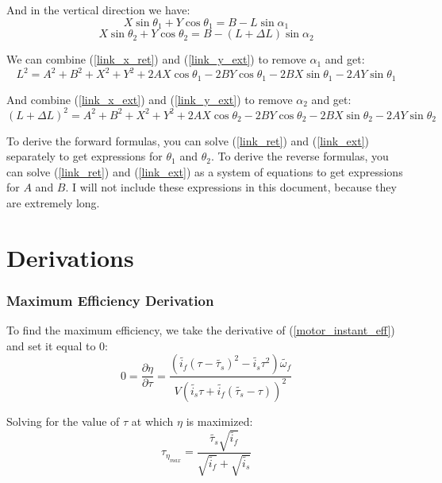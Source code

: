 \documentclass[11pt,a4paper,titlepage]{article}
\begin{document}
	And in the vertical direction we have:
	\begin{equation} \label{link_y_ret}
		X \sin \theta_1 + Y \cos \theta_1 = B - L \sin \alpha_1
	\end{equation}
	\begin{equation} \label{link_y_ext}
		X \sin \theta_2 + Y \cos \theta_2 = B - (L + \Delta L) \sin \alpha_2
	\end{equation}
	
	We can combine (\ref{link_x_ret}) and (\ref{link_y_ext}) to remove $\alpha_1$ and get:
	\begin{equation} \label{link_ret}
		L^2 = A^2 + B^2 + X^2 + Y^2 + 2AX \cos \theta_1 - 2BY \cos \theta_1 - 2BX \sin \theta_1 - 2AY \sin \theta_1
	\end{equation}
	
	And combine (\ref{link_x_ext}) and (\ref{link_y_ext}) to remove $\alpha_2$ and get:
	\begin{equation} \label{link_ext}
		(L + \Delta L)^2 = A^2 + B^2 + X^2 + Y^2 + 2AX \cos \theta_2 - 2BY \cos \theta_2 - 2BX \sin \theta_2 - 2AY \sin \theta_2
	\end{equation}
	
	To derive the forward formulas, you can solve (\ref{link_ret}) and (\ref{link_ext}) separately to get expressions for $\theta_1$ and $\theta_2$. To derive the reverse formulas, you can solve (\ref{link_ret}) and (\ref{link_ext}) as a system of equations to get expressions for $A$ and $B$. I will not include these expressions in this document, because they are extremely long.
	
	\newpage
	\appendix
	\part*{Derivations}
	\section{Maximum Efficiency Derivation} \label{appendixA}
	To find the maximum efficiency, we take the derivative of (\ref{motor_instant_eff}) and set it equal to 0:
	\begin{equation}
		0 = \frac{\partial \eta}{\partial \tau} = \frac{(\tilde{i_f} (\tau - \tilde{\tau_s})^2 - \tilde{i_s} \tau^2) \tilde{\omega_f}}{V (\tilde{i_s} \tau + \tilde{i_f} (\tilde{\tau_s} - \tau))^2}
	\end{equation}
	
	Solving for the value of $\tau$ at which $\eta$ is maximized:
	\begin{equation}
		\tau_{\eta_{max}} = \frac{\tilde{\tau_s} \sqrt{\tilde{i_f}}}{\sqrt{\tilde{i_f}} + \sqrt{\tilde{i_s}}}
	\end{equation}
	
\end{document}
